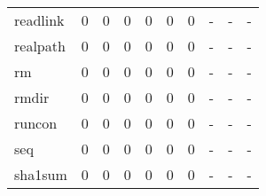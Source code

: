 \begin{longtable}{lp{1.3cm}p{1.3cm}p{1.3cm}p{1.3cm}p{1.3cm}p{1.3cm}p{1.3cm}p{1.3cm}p{1.3cm}}
readlink  &                      0 &                                             0 &                                            0 &                                           0 &                                            0 &                                          0 &                                    - &                                      - &                                    - \\
realpath  &                      0 &                                             0 &                                            0 &                                           0 &                                            0 &                                          0 &                                    - &                                      - &                                    - \\
rm        &                      0 &                                             0 &                                            0 &                                           0 &                                            0 &                                          0 &                                    - &                                      - &                                    - \\
rmdir     &                      0 &                                             0 &                                            0 &                                           0 &                                            0 &                                          0 &                                    - &                                      - &                                    - \\
runcon    &                      0 &                                             0 &                                            0 &                                           0 &                                            0 &                                          0 &                                    - &                                      - &                                    - \\
seq       &                      0 &                                             0 &                                            0 &                                           0 &                                            0 &                                          0 &                                    - &                                      - &                                    - \\
sha1sum   &                      0 &                                             0 &                                            0 &                                           0 &                                            0 &                                          0 &                                    - &                                      - &                                    - \\

\end{longtable}
